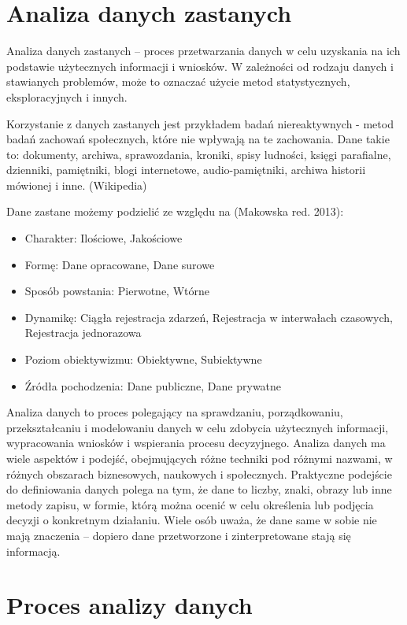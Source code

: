 \documentclass[
  letterpaper,
  DIV=11,
  numbers=noendperiod]{scrreprt}
\providecommand{\tightlist}{%
  \setlength{\itemsep}{0pt}\setlength{\parskip}{0pt}}\usepackage{longtable,booktabs,array}
\begin{document}
\section{Analiza danych zastanych}\label{analiza-danych-zastanych}

Analiza danych zastanych -- proces przetwarzania danych w celu uzyskania
na ich podstawie użytecznych informacji i wniosków. W zależności od
rodzaju danych i stawianych problemów, może to oznaczać użycie metod
statystycznych, eksploracyjnych i innych.

Korzystanie z danych zastanych jest przykładem badań niereaktywnych -
metod badań zachowań społecznych, które nie wpływają na te zachowania.
Dane takie to: dokumenty, archiwa, sprawozdania, kroniki, spisy
ludności, księgi parafialne, dzienniki, pamiętniki, blogi internetowe,
audio-pamiętniki, archiwa historii mówionej i inne. (Wikipedia)

Dane zastane możemy podzielić ze względu na (Makowska red. 2013):

\begin{itemize}
\tightlist
\item
  Charakter: Ilościowe, Jakościowe
\item
  Formę: Dane opracowane, Dane surowe
\item
  Sposób powstania: Pierwotne, Wtórne
\item
  Dynamikę: Ciągła rejestracja zdarzeń, Rejestracja w interwałach
  czasowych, Rejestracja jednorazowa
\item
  Poziom obiektywizmu: Obiektywne, Subiektywne
\item
  Źródła pochodzenia: Dane publiczne, Dane prywatne
\end{itemize}

Analiza danych to proces polegający na sprawdzaniu, porządkowaniu,
przekształcaniu i modelowaniu danych w celu zdobycia użytecznych
informacji, wypracowania wniosków i wspierania procesu decyzyjnego.
Analiza danych ma wiele aspektów i podejść, obejmujących różne techniki
pod różnymi nazwami, w różnych obszarach biznesowych, naukowych i
społecznych. Praktyczne podejście do definiowania danych polega na tym,
że dane to liczby, znaki, obrazy lub inne metody zapisu, w formie, którą
można ocenić w celu określenia lub podjęcia decyzji o konkretnym
działaniu. Wiele osób uważa, że dane same w sobie nie mają znaczenia --
dopiero dane przetworzone i zinterpretowane stają się informacją.

\section{Proces analizy danych}\label{proces-analizy-danych}
\end{document}
